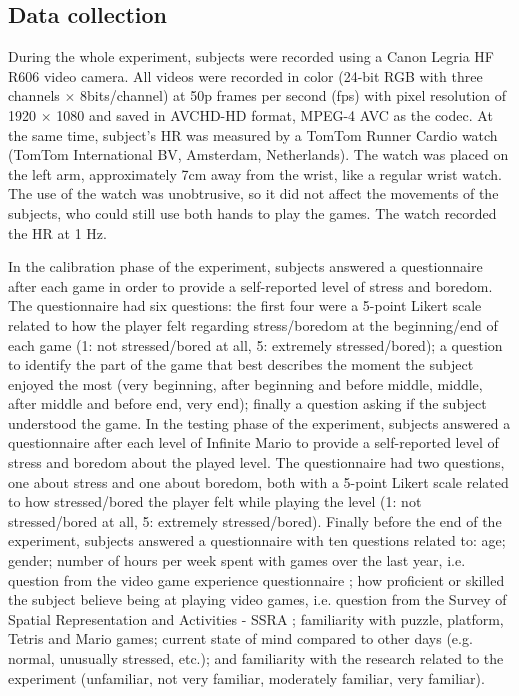 \subsection{Data collection}

During the whole experiment, subjects were recorded using a Canon Legria HF R606 video camera. All videos were recorded in color (24-bit RGB with three channels $\times$ 8bits/channel) at 50p frames per second (fps) with pixel resolution of 1920 $\times$ 1080 and saved in AVCHD-HD format, MPEG-4 AVC as the codec. At the same time, subject's HR was measured by a TomTom Runner Cardio watch (TomTom International BV, Amsterdam, Netherlands). The watch was placed on the left arm, approximately 7cm away from the wrist, like a regular wrist watch. The use of the watch was unobtrusive, so it did not affect the movements of the subjects, who could still use both hands to play the games. The watch recorded the HR at 1 Hz.

In the calibration phase of the experiment, subjects answered a questionnaire after each game in order to provide a self-reported level of stress and boredom. The questionnaire had six questions: the first four were a 5-point Likert scale related to how the player felt regarding stress/boredom at the beginning/end of each game (1: not stressed/bored at all, 5: extremely stressed/bored); a question to identify the part of the game that best describes the moment the subject enjoyed the most (very beginning, after beginning and before middle, middle, after middle and before end, very end); finally a question asking if the subject understood the game. In the testing phase of the experiment, subjects answered a questionnaire after each level of Infinite Mario to provide a self-reported level of stress and boredom about the played level. The questionnaire had two questions, one about stress and one about boredom, both with a 5-point Likert scale related to how stressed/bored the player felt while playing the level (1: not stressed/bored at all, 5: extremely stressed/bored). Finally before the end of the experiment, subjects answered a questionnaire with ten questions related to: age; gender; number of hours per week spent with games over the last year, i.e. question from the video game experience questionnaire \parencite{unsworth2015playing}; how proficient or skilled the subject believe being at playing video games, i.e. question from the Survey of Spatial Representation and Activities - SSRA \parencite{terlecki2005important}; familiarity with puzzle, platform, Tetris and Mario games; current state of mind compared to other days (e.g. normal, unusually stressed, etc.); and familiarity with the research related to the experiment (unfamiliar, not very familiar, moderately familiar, very familiar).

